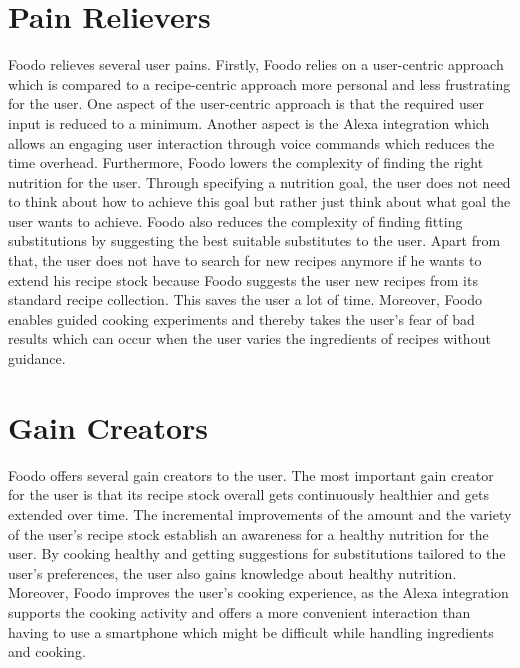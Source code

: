 \section{Pain Relievers}
Foodo relieves several user pains. Firstly, Foodo relies on a user-centric approach which is compared to a recipe-centric approach more personal and less frustrating for the user. One aspect of the user-centric approach is that the required user input is reduced to a minimum. Another aspect is the Alexa integration which allows an engaging user interaction through voice commands which reduces the time overhead. Furthermore, Foodo lowers the complexity of finding the right nutrition for the user. Through specifying a nutrition goal, the user does not need to think about how to achieve this goal but rather just think about what goal the user wants to achieve. Foodo also reduces the complexity of finding fitting substitutions by suggesting the best suitable substitutes to the user. Apart from that, the user does not have to search for new recipes anymore if he wants to extend his recipe stock because Foodo suggests the user new recipes from its standard recipe collection. This saves the user a lot of time. Moreover, Foodo enables guided cooking experiments and thereby takes the user's fear of bad results which can occur when the user varies the ingredients of recipes without guidance.


\section{Gain Creators}
Foodo offers several gain creators to the user. The most important gain creator for the user is that its recipe stock overall gets continuously healthier and gets extended over time. The incremental improvements of the amount and the variety of the user's recipe stock establish an awareness for a healthy nutrition for the user. By cooking healthy and getting suggestions for substitutions tailored to the user's preferences, the user also gains knowledge about healthy nutrition. Moreover, Foodo improves the user's cooking experience, as the Alexa integration supports the cooking activity and offers a more convenient interaction than having to use a smartphone which might be difficult while handling ingredients and cooking.


